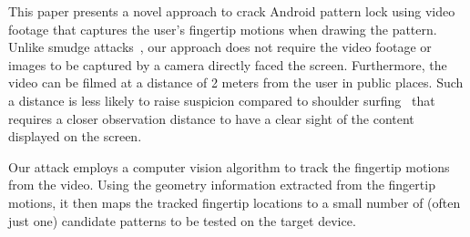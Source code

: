 
This paper presents a novel approach to crack Android pattern lock using
video footage that captures the user's fingertip motions when drawing the pattern. Unlike smudge attacks~\cite{aviv2010smudge}, our approach
does not require the video footage or images to be captured by a camera
directly faced the screen. Furthermore, the video can be filmed at a
distance of 2 meters from the user in public places. Such a distance is less likely
to raise suspicion compared to shoulder
surfing~\cite{shoulder} that requires a
closer observation distance to have a clear sight of the content displayed on the screen. %

Our attack employs a computer vision algorithm to
track the fingertip motions from the video. Using the geometry
information extracted from the fingertip motions, it then maps
the tracked fingertip locations to a small number of (often just one)
candidate patterns to be tested on the target device.


